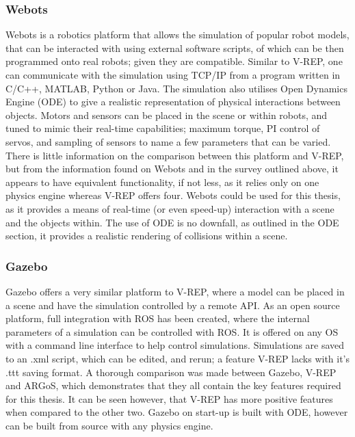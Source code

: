 \documentclass[12pt,openany,a4paper]{book}
\begin{document}
\subsubsection{Webots}
Webots is a robotics platform that allows the simulation of popular robot models, that can be interacted with using external software scripts, of which can be then programmed onto real robots; given they are compatible. Similar to V-REP, one can communicate with the simulation using TCP/IP from a program written in C/C++, MATLAB, Python or Java. The simulation also utilises Open Dynamics Engine (ODE) to give a realistic representation of physical interactions between objects. Motors and sensors can be placed in the scene or within robots, and tuned to mimic their real-time capabilities; maximum torque, PI control of servos, and sampling of sensors to name a few parameters that can be varied. There is little information on the comparison between this platform and V-REP, but from the information found on Webots and in the survey outlined above, it appears to have equivalent functionality, if not less, as it relies only on one physics engine whereas V-REP offers four.
Webots could be used for this thesis, as it provides a means of real-time (or even speed-up) interaction with a scene and the objects within. The use of ODE is no downfall, as outlined in the ODE section, it provides a realistic rendering of collisions within a scene.

\subsubsection{Gazebo}
Gazebo offers a very similar platform to V-REP, where a model can be placed in a scene and have the simulation controlled by a remote API. As an open source platform, full integration with ROS has been created, where the internal parameters of a simulation can be controlled with ROS. It is offered on any OS with a command line interface to help control simulations. Simulations are saved to an .xml script, which can be edited, and rerun; a feature V-REP lacks with it's .ttt saving format. A thorough comparison was made between Gazebo, V-REP and ARGoS, which demonstrates that they all contain the key features required for this thesis. It can be seen however, that V-REP has more positive features when compared to the other two. Gazebo on start-up is built with ODE, however can be built from source with any physics engine.
\end{document}
